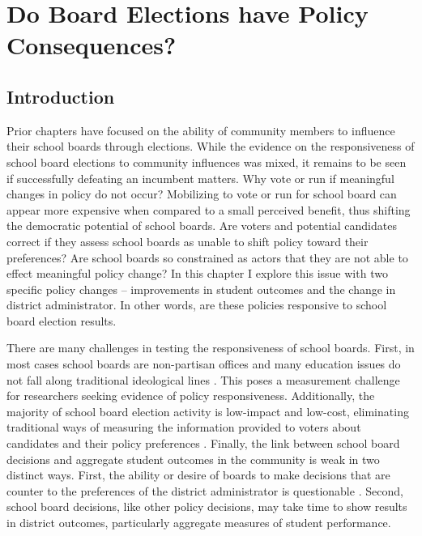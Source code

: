 \chapter{Do Board Elections have Policy Consequences?}
\label{chap:policy}



\section{Introduction}

Prior chapters have focused on the ability of community members to influence 
their school boards through elections. While the evidence on the responsiveness 
of school board elections to community influences was mixed, it remains to 
be seen if successfully defeating an incumbent matters. Why vote or 
run if meaningful changes in policy do not occur? Mobilizing to vote or run for 
school board can appear more expensive when compared to a small perceived 
benefit, thus shifting the democratic potential of school boards. Are voters and 
potential candidates correct if they assess school boards as unable to shift 
policy toward their preferences? Are school boards so constrained as actors that 
they are not able to effect meaningful policy change? In this chapter I explore 
this issue with two specific policy changes -- improvements in student outcomes and 
the change in district administrator. In other words, are these policies responsive 
to school board election results. 

There are many challenges in testing the responsiveness of school boards. First, 
in most 
cases school boards are non-partisan offices and many education issues do not fall 
along traditional ideological lines \citep[for counter example:][]{RefWorks:347}. 
This poses a measurement challenge for researchers seeking evidence of policy 
responsiveness. Additionally, the majority of school board election activity is 
low-impact and low-cost, eliminating traditional ways of measuring the information 
provided to voters about candidates and their policy preferences 
\citep{RefWorks:322,RefWorks:321}. Finally, the link between school board decisions 
and aggregate student outcomes in the community is weak in two distinct ways. First, 
the ability or desire of boards to make decisions that are counter to the preferences 
of the district administrator is questionable \citep{RefWorks:258}. Second, 
school board decisions, like other policy decisions, may take time to 
show results in district outcomes, particularly aggregate measures of student 
performance. 

